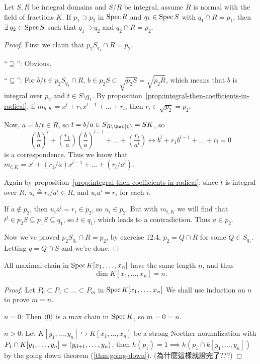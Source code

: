 \begin{theorem} \label{thm:going-down}
  Let $S, R$ be integral domains and $S/R$ be integral, assume $R$ is normal
  with the field of fractions $K$. If $p_1 \supset p_2$ in $\operatorname{Spec} R$ and $q_1 \in \operatorname{Spec} S$
  with $q_1 \cap R = p_1$,
  then $\exists q_2 \in \Spec S$ such that $q_1 \supset q_2$ and $q_2 \cap R = p_2$.

  \begin{proof}
    First we claim that $p_2 S_{q_1} \cap R = p_2$.

    ``$\supseteq$'': Obvious.

    ``$\subseteq$'': For $b/t \in p_2 S_{q_1} \cap R$, $b \in p_2 S \subset \sqrt{p_2 S}
    = \sqrt{p_2 \overline{R}}$, which means that $b$ is integral over $p_2$
    and $t \in S \setminus q_1$. By proposition~\ref{prop:integral-then-coefficients-in-radical},
    if $m_{b, K} = x^l + r_1 x^{l-1} + \dots + r_l$, then $r_i \in \sqrt{p_2} = p_2$.

    Now, $a = b/t \in R$, so $t = b/a \in S_{R \setminus \Set{0}} = SK$,
    so
    \[ \left( \frac{b}{a} \right)^l + 
      \left(\frac{r_1}{a}\right) \left( \frac{b}{a} \right)^{l-1} + \dots
      + \left(\frac{r_l}{a^l}\right) \leftrightarrow b^l + r_1 b^{l-1} + \dots + r_l = 0 \]
    is a correspondence. Thus we know that
    $m_{t, K} = x^l + (r_1/a) x^{l-1} + \dots + (r_l/a^l)$.

    Again by proposition~\ref{prop:integral-then-coefficients-in-radical},
    since $t$ is integral over $R$, $u_i \triangleq r_i / a^i \in R$,
    and $u_i a^i = r_i$ for each $i$.

    If $a \not\in p_2$, then $u_i a^i = r_i \in p_2$, so $u_i \in p_2$.
    But with $m_{t, K}$ we will find that $t^l \in p_2 S \subseteq p_1 S \subseteq q_1$,
    so $t \in q_1$, which leads to a contradiction. Thus $a \in p_2$.

    Now we've proved $p_2 S_{q_1} \cap R = p_2$,
    by exercise 12.4, $p_2 = Q \cap R$ for some $Q \in S_{q_1}$.
    Letting $q = Q \cap S$ and we're done.
  \end{proof}
\end{theorem}

\begin{theorem}
  All maximal chain in $\operatorname{Spec} K[x_1, \dots, x_n]$ have the same length $n$, and thus
  \[ \dim K[x_1, \dots, x_n] = n. \]

  \begin{proof}
    Let $P_0 \subset P_1 \subset \dots \subset P_m$ in $\operatorname{Spec} K[x_1, \dots, x_n]$
    We shall use induction on $n$ to prove $m = n$.

    $n = 0$: Then $\langle0\rangle$ is a max chain in $\operatorname{Spec} K$, so $m = 0 = n$.

    $n > 0$: Let $K[y_1, \dots, y_n] \hookrightarrow K[x_1, \dots, x_n]$
    be a strong Noether normalization with $P_1 \cap K[y_1, \dots, y_n] = \langle y_{d+1}, \dots, y_n\rangle$,
    then $h(p_1) = 1 \implies h(p_1 \cap k[y_1, \dots, y_n])$ by
    the going down theorem (\ref{thm:going-down}). (為什麼這樣就證完了???)
  \end{proof}
\end{theorem}
